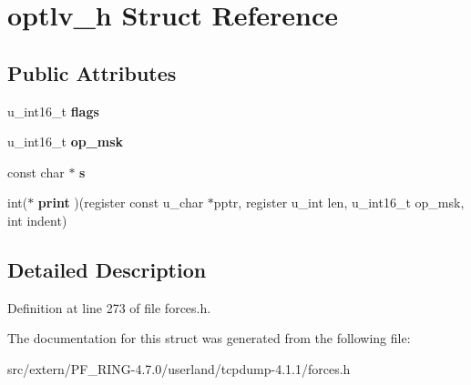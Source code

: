 \hypertarget{structoptlv__h}{
\section{optlv\_\-h Struct Reference}
\label{structoptlv__h}
}
\subsection*{Public Attributes}
\begin{DoxyCompactItemize}
\item 
\hypertarget{structoptlv__h_ad18c71d78feca88d6ff8f7f57646bef4}{
u\_\-int16\_\-t {\bfseries flags}}
\label{structoptlv__h_ad18c71d78feca88d6ff8f7f57646bef4}

\item 
\hypertarget{structoptlv__h_a0389882ee281c17117364d53b6dc296f}{
u\_\-int16\_\-t {\bfseries op\_\-msk}}
\label{structoptlv__h_a0389882ee281c17117364d53b6dc296f}

\item 
\hypertarget{structoptlv__h_a94d57e292c50d9a38960cee389d84be6}{
const char $\ast$ {\bfseries s}}
\label{structoptlv__h_a94d57e292c50d9a38960cee389d84be6}

\item 
\hypertarget{structoptlv__h_aa8315d80092f664197f27b173730509a}{
int($\ast$ {\bfseries print} )(register const u\_\-char $\ast$pptr, register u\_\-int len, u\_\-int16\_\-t op\_\-msk, int indent)}
\label{structoptlv__h_aa8315d80092f664197f27b173730509a}

\end{DoxyCompactItemize}


\subsection{Detailed Description}


Definition at line 273 of file forces.h.



The documentation for this struct was generated from the following file:\begin{DoxyCompactItemize}
\item 
src/extern/PF\_\-RING-\/4.7.0/userland/tcpdump-\/4.1.1/forces.h\end{DoxyCompactItemize}
